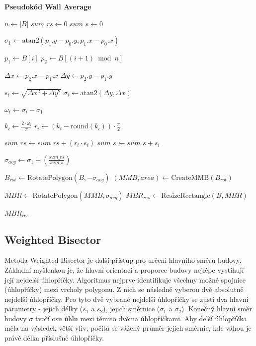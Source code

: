 \newpage
\textbf{Pseudokód Wall Average}
\begin{algorithm}
\caption{Wall Average}
\label{alg:wallaverage}
\begin{algorithmic}[1]
    \State $n \gets |B|$
    \State $sum\_rs \gets 0$
    \State $sum\_s \gets 0$
    
    \State $\sigma_1 \gets \text{atan2}(p_1.y - p_0.y, p_1.x - p_0.x)$ 
    
        \State $p_1 \gets B[i]$
        \State $p_2 \gets B[(i+1) \bmod n]$
        
        \State $\Delta x \gets p_2.x - p_1.x$
        \State $\Delta y \gets p_2.y - p_1.y$
        
        \State $s_i \gets \sqrt{\Delta x^2 + \Delta y^2}$ 
        \State $\sigma_i \gets \text{atan2}(\Delta y, \Delta x)$ 
        
        \State $\omega_i \gets \sigma_i - \sigma_1$
        
        \State $k_i \gets \frac{2 \cdot \omega_i}{\pi}$ 
        \State $r_i \gets (k_i - \text{round}(k_i)) \cdot \frac{\pi}{2}$ 
        
        \State $sum\_rs \gets sum\_rs + (r_i \cdot s_i)$ 
        \State $sum\_s \gets sum\_s + s_i$ 
    \EndFor
    
    \State $\sigma_{avg} \gets \sigma_1 + \left(\frac{sum\_rs}{sum\_s}\right)$ 
    
    \State $B_{rot} \gets \text{RotatePolygon}(B, -\sigma_{avg})$ 
    \State $(MMB, area) \gets \text{CreateMMB}(B_{rot})$ 
    
    \State $MBR \gets \text{RotatePolygon}(MMB, \sigma_{avg})$ 
    \State $MBR_{res} \gets \text{ResizeRectangle}(B, MBR)$ 
    
    \State \Return $MBR_{res}$
\end{algorithmic}
\end{algorithm}

\newpage
\subsection{Weighted Bisector}
Metoda Weighted Bisector  je další přístup pro určení hlavního směru  budovy. 
Základní myšlenkou je, že hlavní orientaci a proporce budovy nejlépe vystihují její nejdelší úhlopříčky.
Algoritmus nejprve identifikuje všechny možné spojnice (úhlopříčky) mezi vrcholy polygonu. Z nich se následně vyberou dvě absolutně nejdelší úhlopříčky.
Pro tyto dvě vybrané nejdelší úhlopříčky se zjistí dva hlavní parametry - jejich délky ($s_1$ a $s_2$), jejich směrnice ($\sigma_1$ a $\sigma_2$).
Konečný hlavní směr budovy $\sigma$ tvoří osu úhlu mezi těmito dvěma úhlopříčkami.  Aby delší úhlopříčka měla na výsledek větší vliv, počítá se vážený průměr jejich směrnic, kde váhou je právě délka příslušné úhlopříčky.

